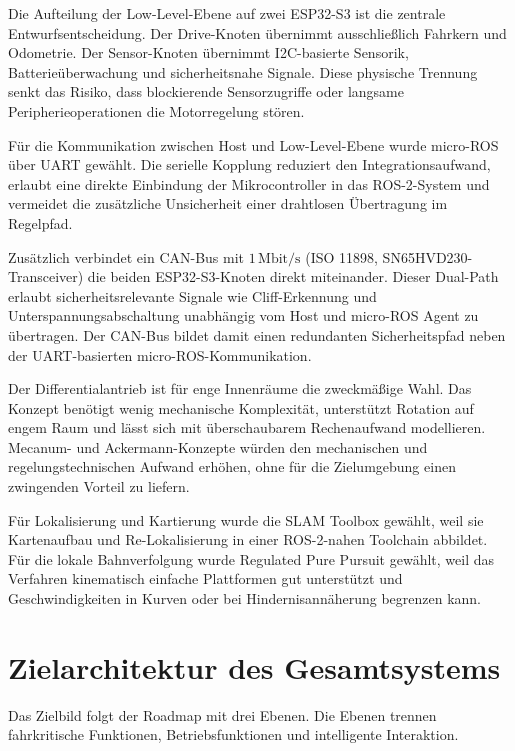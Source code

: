 Die Aufteilung der Low-Level-Ebene auf zwei ESP32-S3 ist die zentrale Entwurfsentscheidung. Der Drive-Knoten übernimmt ausschließlich Fahrkern und Odometrie. Der Sensor-Knoten übernimmt I2C-basierte Sensorik, Batterieüberwachung und sicherheitsnahe Signale. Diese physische Trennung senkt das Risiko, dass blockierende Sensorzugriffe oder langsame Peripherieoperationen die Motorregelung stören.

Für die Kommunikation zwischen Host und Low-Level-Ebene wurde micro-ROS über UART gewählt. Die serielle Kopplung reduziert den Integrationsaufwand, erlaubt eine direkte Einbindung der Mikrocontroller in das ROS-2-System und vermeidet die zusätzliche Unsicherheit einer drahtlosen Übertragung im Regelpfad.

Zusätzlich verbindet ein CAN-Bus mit $1\,\mathrm{Mbit/s}$ (ISO 11898, SN65HVD230-Transceiver) die beiden ESP32-S3-Knoten direkt miteinander. Dieser Dual-Path erlaubt sicherheitsrelevante Signale wie Cliff-Erkennung und Unterspannungsabschaltung unabhängig vom Host und micro-ROS Agent zu übertragen. Der CAN-Bus bildet damit einen redundanten Sicherheitspfad neben der UART-basierten micro-ROS-Kommunikation.

Der Differentialantrieb ist für enge Innenräume die zweckmäßige Wahl. Das Konzept benötigt wenig mechanische Komplexität, unterstützt Rotation auf engem Raum und lässt sich mit überschaubarem Rechenaufwand modellieren. Mecanum- und Ackermann-Konzepte würden den mechanischen und regelungstechnischen Aufwand erhöhen, ohne für die Zielumgebung einen zwingenden Vorteil zu liefern.

Für Lokalisierung und Kartierung wurde die SLAM Toolbox gewählt, weil sie Kartenaufbau und Re-Lokalisierung in einer ROS-2-nahen Toolchain abbildet. Für die lokale Bahnverfolgung wurde Regulated Pure Pursuit gewählt, weil das Verfahren kinematisch einfache Plattformen gut unterstützt und Geschwindigkeiten in Kurven oder bei Hindernisannäherung begrenzen kann.

\section{Zielarchitektur des Gesamtsystems}

Das Zielbild folgt der Roadmap mit drei Ebenen. Die Ebenen trennen fahrkritische Funktionen, Betriebsfunktionen und intelligente Interaktion.


